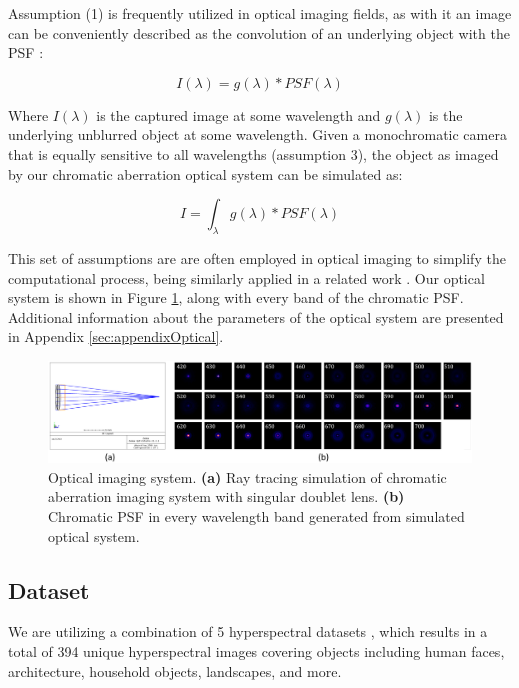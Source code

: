 \documentclass{article}
\begin{document}
Assumption (1) is frequently utilized in optical imaging fields, as with it an image can be conveniently described as the convolution of an underlying object with the PSF \cite{goodman2005introduction}:

\begin{equation}
    I(\lambda) = g(\lambda) \ast PSF(\lambda)
\end{equation}

Where $I(\lambda)$ is the captured image at some wavelength and $g(\lambda)$ is the underlying unblurred object at some wavelength. Given a monochromatic camera that is equally sensitive to all wavelengths (assumption 3), the object as imaged by our chromatic aberration optical system can be simulated as:

\begin{equation}
    I = \int_\lambda g(\lambda) \ast PSF(\lambda)
\end{equation}

This set of assumptions are are often employed in optical imaging to simplify the computational process, being similarly applied in a related work \cite{jeon2019compact}. Our optical system is shown in Figure \ref{fig:opticalsystem}, along with every band of the chromatic PSF. Additional information about the parameters of the optical system are presented in Appendix \ref{sec:appendixOptical}.

\begin{figure}
    \centering
    \includegraphics[width=\textwidth]{figs/opticalsystem.png}
    \caption{Optical imaging system. \textbf{(a)} Ray tracing simulation of chromatic aberration imaging system with singular doublet lens. \textbf{(b)} Chromatic PSF in every wavelength band generated from simulated optical system.}
    \label{fig:opticalsystem}
\end{figure}

\subsection{Dataset}
We are utilizing a combination of 5 hyperspectral datasets \cite{CAVE_0293}\cite{chakrabarti2011statistics}\cite{arad_and_ben_shahar_2016_ECCV}\cite{DeepCASSI:SIGA:2017}\cite{farrell2003simulation}, which results in a total of 394 unique hyperspectral images covering objects including human faces, architecture, household objects, landscapes, and more.
\end{document}
